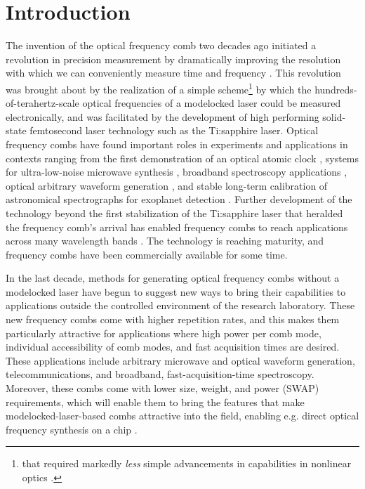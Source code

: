  \chapter{Introduction}
\label{ch:intro}

The invention of the optical frequency comb two decades ago initiated a revolution in precision measurement by dramatically improving the resolution with which we can conveniently measure time and frequency \cite{Diddams2000,Jones2000,Udem2002,Hall2006,Hansch2006}. This revolution was brought about by the realization of a simple scheme\footnote{that required markedly \textit{less} simple advancements in capabilities in nonlinear optics \cite{Ranka2000}.} by which the hundreds-of-terahertz-scale optical frequencies of a modelocked laser could be measured electronically, and was facilitated by the development of high performing solid-state femtosecond laser technology such as the Ti:sapphire laser. Optical frequency combs have found important roles in experiments and applications in contexts ranging from the first demonstration of an optical atomic clock \cite{Diddams2001}, systems for ultra-low-noise microwave synthesis \cite{Fortier2011}, broadband spectroscopy applications \cite{Diddams2007,Coddington2016}, optical arbitrary waveform generation \cite{Cundiff2010}, and stable long-term calibration of astronomical spectrographs for exoplanet detection \cite{Steinmetz2008}. Further development of the technology beyond the first stabilization of the Ti:sapphire laser that heralded the frequency comb's arrival has enabled frequency combs to reach applications across many wavelength bands \cite{Washburn2004a,Gohle2005b,Diddams2010,Faist2016}. The technology is reaching maturity, and frequency combs have been commercially available for some time.

In the last decade, methods for generating optical frequency combs without a modelocked laser have begun to suggest new ways to bring their capabilities to applications outside the controlled environment of the research laboratory. These new frequency combs come with higher repetition rates, and this makes them particularly attractive for applications where high power per comb mode, individual accessibility of comb modes, and fast acquisition times are desired. These applications include arbitrary microwave and optical waveform generation, telecommunications, and broadband, fast-acquisition-time spectroscopy. Moreover, these combs come with lower size, weight, and power (SWAP) requirements, which will enable them to bring the features that make modelocked-laser-based combs attractive into the field, enabling e.g. direct optical frequency synthesis on a chip \cite{Spencer2018}.

